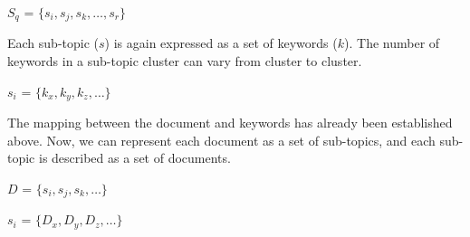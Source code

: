 \centerline{$S_q$ = $\{s_i, s_j, s_k,\dots, s_r\}$}

Each sub-topic ($s$) is again expressed as a set of keywords  ($k$). The number of keywords in a sub-topic cluster can vary from cluster to cluster.

\centerline{$s_i$ = $\{k_x, k_y, k_z,\dots\}$}

The mapping between the document and keywords has already been established above. Now, we can represent each document as a set of sub-topics, and each sub-topic is described as a set of documents.

\centerline{$D$ = $\{s_i, s_j, s_k,\dots\}$ }
\centerline{$s_i$ = $\{D_x, D_y, D_z,\dots\}$}


